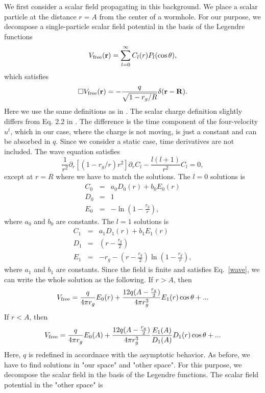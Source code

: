 \documentclass[prd, amsfonts, twocolumn, nofootinbib, showpacs]{revtex4}
\begin{document}
We first consider a scalar field propagating in this background.
We place a scalar particle at the distance $r=A$ from the center of a wormhole.
For our purpose, we decompose a single-particle scalar field potential in the basis of the Legendre functions
\begin{eqnarray}
V_{\rm free}({\bf r})=\sum_{l=0}^\infty C_{l} (r)P_l(\cos\theta),
\end{eqnarray}
which satisfies
\begin{equation}
\label{wave}
\Box V_{\rm free}({\bf r})=-\frac{q}{\sqrt{1-r_g/R}}\delta ({\bf r}-{\bf R}).
\end{equation}
Here we use the same definitions as in \cite{Dai:2012ni}. The scalar charge
definition slightly differs from  Eq. 2.2 in \cite{Wiseman:2000rm}. The
difference is the time component of the four-velocity $u^t$, 
which in our case, where the charge is not moving, is just a
constant and can be absorbed in $q$. Since we consider a static case, time derivatives are not included. The wave equation satisfies
\begin{equation}
\frac{1}{r^2}\partial_r \left[(1-r_g/r)r^2\right]\partial_r C_l -\frac{l(l+1)}{r^2}C_l=0 ,
\end{equation}
except at $r=R$ where we have to match the solutions. The $l=0$ solutions is
\begin{eqnarray}
C_0&=& a_0 D_0(r) +b_0 E_0(r)\\
D_0&=&1\\
E_0&=&-\ln (1-\frac{r_g}{r}) ,
\end{eqnarray}
where $a_0$ and $b_0$ are constants.
The $l=1$ solutions is
\begin{eqnarray}
C_1&=& a_1 D_1(r) +b_1 E_1(r)\\
D_1&=&(r-\frac{r_g}{2})\\
E_1&=&-r_g-(r-\frac{r_g}{2})\ln(1-\frac{r_g}{r}) ,
\end{eqnarray}
where $a_1$ and $b_1$ are constants. Since the field is finite and satisfies Eq.~\eqref{wave}, we can write the whole solution as the following.
If $r>A$, then
\begin{eqnarray}
V_{\rm free} = \frac{q}{4\pi r_g}E_0(r)+\frac{12q(A-\frac{r_g}{2})}{4\pi r_g^3} E_1(r)\cos\theta+...
\end{eqnarray}
If $r<A$, then
\begin{eqnarray}
V_{\rm free} = \frac{q}{4\pi r_g}E_0(A)+\frac{12q(A-\frac{r_g}{2})}{4\pi r_g^3}\frac{E_1(A)}{D_1(A)}D_1(r)\cos\theta+...
\end{eqnarray}
Here, $q$ is redefined in accordnace with the asymptotic behavior. As before, we have to find solutions in "our space" and "other space". For this purpose, we decompose the scalar field in the basis of the Legendre functions. The scalar field potential in the "other space" is
\end{document}
